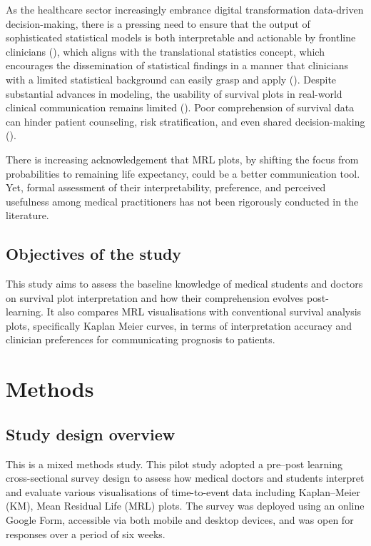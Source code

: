 \documentclass[
  onecolumn]{article}
\begin{document}
As the healthcare sector increasingly embrance digital transformation
data-driven decision-making, there is a pressing need to ensure that the
output of sophisticated statistical models is both interpretable and
actionable by frontline clinicians
(\citet{belangerSharedDecisionmakingPalliative2011}), which aligns with
the translational statistics concept, which encourages the dissemination
of statistical findings in a manner that clinicians with a limited
statistical background can easily grasp and apply
(\citet{mccabeArtTranslationalStatistics2022a}). Despite substantial
advances in modeling, the usability of survival plots in real-world
clinical communication remains limited
(\citet{coxSurvivalAttributableExposure2009}). Poor comprehension of
survival data can hinder patient counseling, risk stratification, and
even shared decision-making
(\citet{trevenaPresentingQuantitativeInformation2013}).

There is increasing acknowledgement that MRL plots, by shifting the
focus from probabilities to remaining life expectancy, could be a better
communication tool. Yet, formal assessment of their interpretability,
preference, and perceived usefulness among medical practitioners has not
been rigorously conducted in the literature.

\subsection{Objectives of the study}\label{objectives-of-the-study}

This study aims to assess the baseline knowledge of medical students and
doctors on survival plot interpretation and how their comprehension
evolves post-learning. It also compares MRL visualisations with
conventional survival analysis plots, specifically Kaplan Meier curves,
in terms of interpretation accuracy and clinician preferences for
communicating prognosis to patients.

\section{Methods}\label{methods}

\subsection{Study design overview}\label{study-design-overview}

This is a mixed methods study. This pilot study adopted a pre--post
learning cross-sectional survey design to assess how medical doctors and
students interpret and evaluate various visualisations of time-to-event
data including Kaplan--Meier (KM), Mean Residual Life (MRL) plots. The
survey was deployed using an online Google Form, accessible via both
mobile and desktop devices, and was open for responses over a period of
six weeks.
\end{document}
